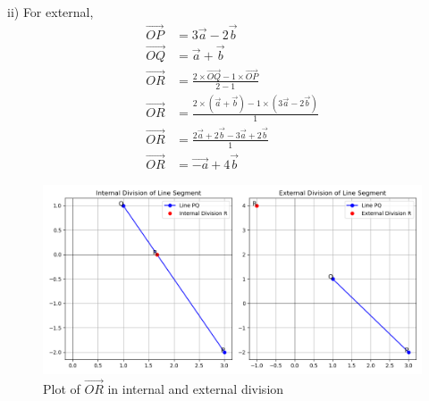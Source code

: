 \documentclass[journal]{IEEEtran}
\begin{document}
ii) For external,\\
\begin{align*}
\overrightarrow{OP} &= 3\overrightarrow{a} - 2\overrightarrow{b} \\
\overrightarrow{OQ} &= \overrightarrow{a} + \overrightarrow{b} \\
\overrightarrow{OR} &= \frac{2 \times \overrightarrow{OQ} - 1 \times \overrightarrow{OP}}{2 - 1} \\
\overrightarrow{OR} &= \frac{2 \times (\overrightarrow{a} + \overrightarrow{b}) - 1 \times (3\overrightarrow{a} - 2\overrightarrow{b})}{1} \\
\overrightarrow{OR} &= \frac{2\overrightarrow{a} + 2\overrightarrow{b} - 3\overrightarrow{a} + 2\overrightarrow{b}}{1} \\
\overrightarrow{OR} &= \overrightarrow{-a} + 4\overrightarrow{b}
\end{align*}

\begin{figure}[ht]
   \centering
   \includegraphics[width=0.7\linewidth]{figs/1-1.4-9n.png}
   \caption{Plot of $\overrightarrow{OR}$ in internal and external division}
   \label{fig:1}
\end{figure}
\end{document}
